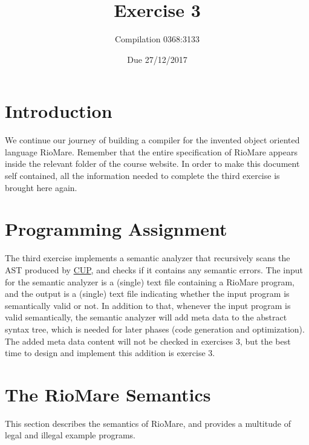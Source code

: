 \documentclass{article}
\begin{document}
\title{Exercise 3}

\author{Compilation 0368:3133}

\date{Due 27/12/2017}

\maketitle

\section{Introduction}
We continue our journey of building a compiler
for the invented object oriented language RioMare.
Remember that the entire specification of RioMare appears
inside the relevant folder of the course website.
In order to make this document self contained,
all the information needed to complete the third exercise is brought here again.

\section{Programming Assignment}
The third exercise implements a semantic analyzer that
recursively scans the AST produced by
\href{http://www2.cs.tum.edu/projects/cup/}{CUP},
and checks if it contains any semantic errors.
The input for the semantic analyzer is a (single) text file containing a RioMare program,
and the output is a (single) text file indicating whether the input program
is semantically valid or not.
In addition to that, whenever the input program is valid semantically,
the semantic analyzer will add meta data to the abstract syntax tree,
which is needed for later phases (code generation and optimization).
The added meta data content will not be checked in exercises $3$,
but the best time to design and implement this addition is
exercise $3$.

\section{The RioMare Semantics}
This section describes the semantics of RioMare,
and provides a multitude of legal and illegal example programs.
\end{document}
